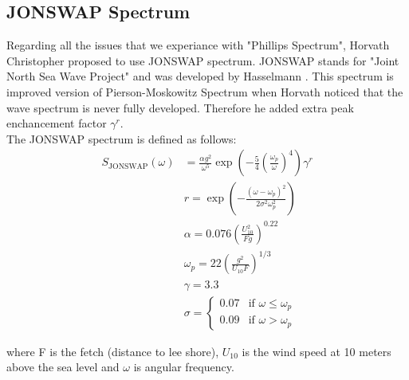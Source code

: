 \subsection{JONSWAP Spectrum}
Regarding all the issues that we experiance with "Phillips Spectrum", Horvath Christopher \cite{horvath2015} proposed to use JONSWAP spectrum.
JONSWAP stands for "Joint North Sea Wave Project" and was developed by Hasselmann \cite[et al. in 1973]{hasselmann1973}. This spectrum is improved version of Pierson-Moskowitz Spectrum \cite{pierson1964} when Horvath noticed that the wave spectrum is never fully developed.
Therefore he added extra peak enchancement factor $\gamma^r$.\\
The JONSWAP spectrum is defined as follows:
\begin{equation}
    \begin{aligned}
        S_{\text{JONSWAP}}(\omega) &= \frac{\alpha g^{2}}{\omega^{5}} \exp \left(-\frac{5}{4} \left(\frac{\omega_{p}}{\omega}\right)^{4}\right) \gamma^{r} \\
        &r = \exp\left(-\frac{(\omega - \omega_p)^{2}}{2 \sigma^{2}\omega^{2}_p}\right) \\
        &\alpha = 0.076 \left( \frac{U^{2}_{10}}{Fg} \right)^{0.22} \\
        &\omega_p = 22 \left( \frac{g^{2}}{U_{10}F} \right)^{1/3} \\
        &\gamma = 3.3 \\
        &\sigma = 
        \begin{cases} 
        0.07 & \text{if } \omega \leq \omega_p \\
        0.09 & \text{if } \omega > \omega_p
        \end{cases}
    \end{aligned}
\end{equation}

where F is the fetch (distance to lee shore), $U_{10}$ is the wind speed at 10 meters above the sea level and $\omega$ is angular frequency.

